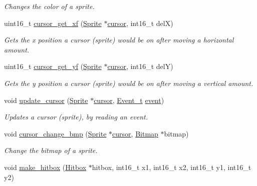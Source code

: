 \begin{DoxyCompactItemize}
\begin{DoxyCompactList}\small\item\em Changes the color of a sprite. \end{DoxyCompactList}\item 
uint16\+\_\+t \mbox{\hyperlink{group__sprite_gae179135dc9bd1c7da4a8eb774237ec7e}{cursor\+\_\+get\+\_\+xf}} (\mbox{\hyperlink{struct_sprite}{Sprite}} $\ast$\mbox{\hyperlink{pengoo_8c_a3a7ea4305773abf5347bb261a8a5c16b}{cursor}}, int16\+\_\+t delX)
\begin{DoxyCompactList}\small\item\em Gets the x position a cursor (sprite) would be on after moving a horizontal amount. \end{DoxyCompactList}\item 
uint16\+\_\+t \mbox{\hyperlink{group__sprite_gabfdb11ab1c80b5083fd8b64320139924}{cursor\+\_\+get\+\_\+yf}} (\mbox{\hyperlink{struct_sprite}{Sprite}} $\ast$\mbox{\hyperlink{pengoo_8c_a3a7ea4305773abf5347bb261a8a5c16b}{cursor}}, int16\+\_\+t delY)
\begin{DoxyCompactList}\small\item\em Gets the y position a cursor (sprite) would be on after moving a vertical amount. \end{DoxyCompactList}\item 
void \mbox{\hyperlink{group__sprite_ga90f5eec8870a027c011108bc4885880c}{update\+\_\+cursor}} (\mbox{\hyperlink{struct_sprite}{Sprite}} $\ast$\mbox{\hyperlink{pengoo_8c_a3a7ea4305773abf5347bb261a8a5c16b}{cursor}}, \mbox{\hyperlink{struct_event__t}{Event\+\_\+t}} \mbox{\hyperlink{pengoo_8c_af662780d461acf9ac3b1321884e7cb01}{event}})
\begin{DoxyCompactList}\small\item\em Updates a cursor (sprite), by reading an event. \end{DoxyCompactList}\item 
void \mbox{\hyperlink{group__sprite_gad12aa07248bed260a545f3ee69372842}{cursor\+\_\+change\+\_\+bmp}} (\mbox{\hyperlink{struct_sprite}{Sprite}} $\ast$\mbox{\hyperlink{pengoo_8c_a3a7ea4305773abf5347bb261a8a5c16b}{cursor}}, \mbox{\hyperlink{struct_bitmap}{Bitmap}} $\ast$bitmap)
\begin{DoxyCompactList}\small\item\em Change the bitmap of a sprite. \end{DoxyCompactList}\item 
void \mbox{\hyperlink{group__sprite_gadaf8e12cd78fdf0d2ea5b182ed1072c1}{make\+\_\+hitbox}} (\mbox{\hyperlink{struct_hitbox}{Hitbox}} $\ast$hitbox, int16\+\_\+t x1, int16\+\_\+t x2, int16\+\_\+t y1, int16\+\_\+t y2)

\end{DoxyCompactItemize}
